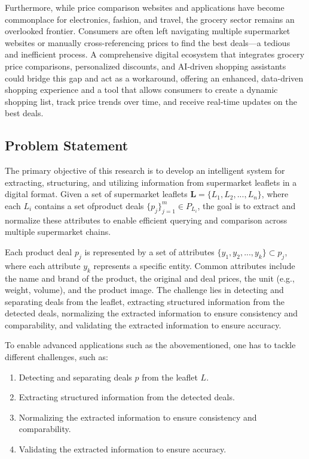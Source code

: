 \documentclass[11pt]{article}
\begin{document}
Furthermore, while price comparison websites and applications have become commonplace for electronics, fashion, and travel, the grocery sector remains an overlooked frontier. Consumers are often left navigating multiple supermarket websites or manually cross-referencing prices to find the best deals—a tedious and inefficient process. A comprehensive digital ecosystem that integrates grocery price comparisons, personalized discounts, and AI-driven shopping assistants could bridge this gap and act as a workaround, offering an enhanced, data-driven shopping experience and a tool that allows consumers to create a dynamic shopping list, track price trends over time, and receive real-time updates on the best deals.

\subsection{Problem Statement}
The primary objective of this research is to develop an intelligent system for extracting, structuring, and utilizing information from supermarket leaflets in a digital format. Given a set of supermarket leaflets $\mathbf{L} = \{L_1, L_2, ..., L_n\}$, where each $L_i$ contains a set ofproduct deals $\{p_j\}_{j=1}^{m} \in P_{L_i}$, the goal is to extract and normalize these attributes to enable efficient querying and comparison across multiple supermarket chains.

Each product deal $p_j$ is represented by a set of attributes $\{y_1, y_2, ..., y_k\} \subset p_j$, where each attribute $y_k$ represents a specific entity. Common attributes include the name and brand of the product, the original and deal prices, the unit (e.g., weight, volume), and the product image. The challenge lies in detecting and separating deals from the leaflet, extracting structured information from the detected deals, normalizing the extracted information to ensure consistency and comparability, and validating the extracted information to ensure accuracy. 

To enable advanced applications such as the abovementioned, one has to tackle different challenges, such as:
\begin{enumerate}
    \item Detecting and separating deals $p$ from the leaflet $L$.
    \item Extracting structured information from the detected deals.
    \item Normalizing the extracted information to ensure consistency and comparability.
    \item Validating the extracted information to ensure accuracy.
\end{enumerate}
\end{document}
